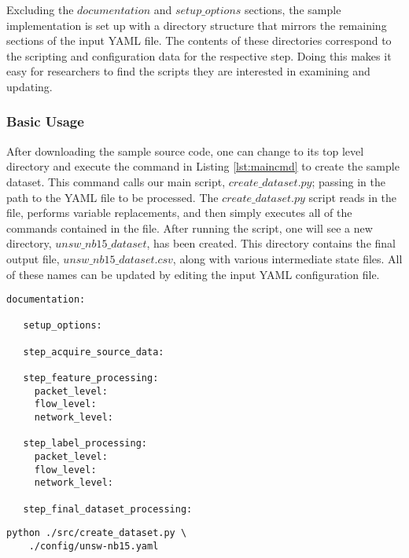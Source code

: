\documentclass[sigconf, anonymous, screen]{acmart}
\begin{document}
Excluding the $documentation$ and $setup\_options$ sections, the sample implementation is set up with a directory structure that mirrors the remaining sections of the input YAML file.
The contents of these directories correspond to the scripting and configuration data for the respective step.
Doing this makes it easy for researchers to find the scripts they are interested in examining and updating.

\subsubsection{Basic Usage}\label{subsubsec:basic_usage}
After downloading the sample source code, one can change to its top level directory and execute the command in Listing \ref{lst:maincmd} to create the sample dataset.
This command calls our main script, $create\_dataset.py$; passing in the path to the YAML file to be processed.
The $create\_dataset.py$ script reads in the file, performs variable replacements, and then simply executes all of the commands contained  in the file.
After running the script, one will see a new directory, $unsw\_nb15\_dataset$, has been created.
This directory contains the final output file, $unsw\_nb15\_dataset.csv$, along with various intermediate state files.
All of these names can be updated by editing the input YAML configuration file.

\noindent\begin{minipage}{\linewidth}
\begin{lstlisting}[aboveskip=10pt, label=lst:yamltemplate, caption={A template input file for our sample guidelines implementation.  Each section would be filled in with either information or explicit commands that get run to generate a feature set from network source data.}, captionpos=b, basicstyle=\footnotesize, backgroundcolor=\color{gray!10!white}, frame=stb]
   documentation:
   
   setup_options:
   
   step_acquire_source_data:
   
   step_feature_processing:
     packet_level:
     flow_level:
     network_level:
   
   step_label_processing:
     packet_level:
     flow_level:
     network_level:
   
   step_final_dataset_processing:
\end{lstlisting}
\end{minipage}


\begin{lstlisting}[label=lst:maincmd, caption={The command to run to execute the sample implementation of the guidelines.}, captionpos=b, basicstyle=\footnotesize, backgroundcolor=\color{gray!10!white}, frame=stb, breaklines=True]
python ./src/create_dataset.py \
    ./config/unsw-nb15.yaml
\end{lstlisting}
\end{document}
